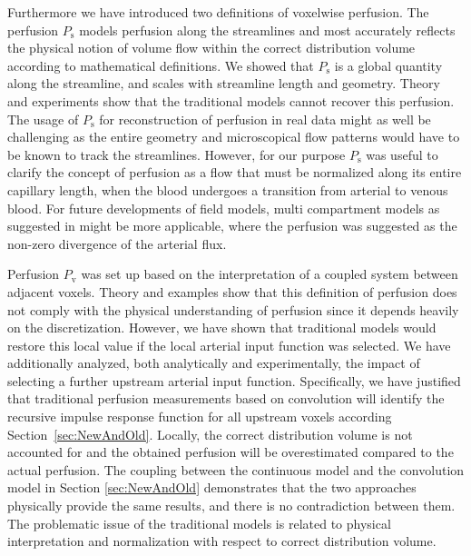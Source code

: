 \documentclass[journal,twocolumn]{IEEEtran}
\newcommand{\Perfv}{P_{\mathrm{v}}}
\newcommand{\Perfs}{P_{\mathrm{s}}}
\begin{document}
	Furthermore we have introduced two definitions of voxelwise perfusion.
	The perfusion $\Perfs$ models perfusion along the streamlines and most accurately reflects the physical notion of volume flow within the correct distribution volume according to mathematical definitions. We showed that $\Perfs$ is a global quantity along the streamline, and scales with streamline length and geometry.
	Theory and experiments show that the traditional models cannot recover this perfusion. The usage of $\Perfs$ for reconstruction of perfusion in real data might as well be challenging as the entire geometry and microscopical flow patterns would have to be known to track the streamlines. However, for our purpose $\Perfs$ was useful to clarify the concept of perfusion as a flow that must be normalized along its entire capillary length, when the blood undergoes a transition from arterial to venous blood. 
	For future developments of field models, multi compartment models as suggested in \cite{sourbron14} might be more applicable, where the perfusion was suggested as the non-zero divergence of the arterial flux.

	Perfusion $\Perfv$ was set up based on the interpretation of a coupled system between adjacent voxels. 
	Theory and examples show that this definition of perfusion does not comply with the physical understanding of perfusion since it depends heavily on the discretization.
	However, we have shown that traditional models would restore this local value if the local arterial input function was selected. 
	We have additionally analyzed, both analytically and experimentally, the impact of selecting a further upstream arterial input function.
	Specifically, we have justified that traditional perfusion measurements based on convolution will identify the recursive impulse response function for all upstream voxels according Section~\ref{sec:NewAndOld}. 
Locally, the correct distribution volume is not accounted for and the obtained perfusion will be overestimated compared to the actual perfusion. The coupling between the continuous model and the convolution model in Section \ref{sec:NewAndOld} demonstrates that the two approaches physically provide the same results, and there is no contradiction between them. The problematic issue of the traditional models is related to physical interpretation and normalization with respect to correct distribution volume.

	
	
\end{document}
